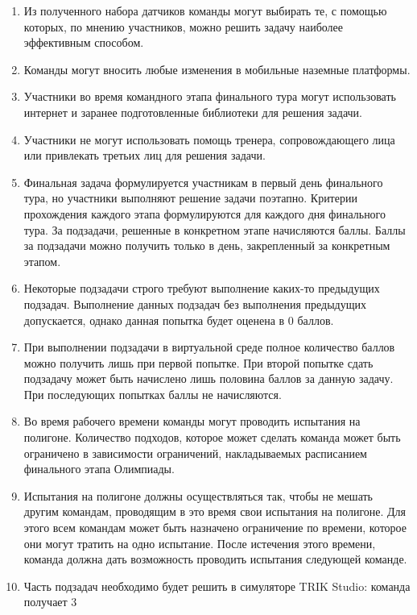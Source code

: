 \begin{enumerate}
    \item Из полученного набора датчиков команды могут выбирать те, с помощью которых,
            по мнению участников, можно решить задачу наиболее эффективным способом.
    \item Команды могут вносить любые изменения в мобильные наземные платформы.
    \item Участники во время командного этапа финального тура могут использовать интернет и заранее подготовленные библиотеки для решения задачи.
    \item Участники не могут использовать помощь тренера, сопровождающего лица или привлекать третьих лиц для решения задачи.
    \item Финальная задача формулируется участникам в первый день финального тура, но участники выполняют решение
            задачи поэтапно. Критерии прохождения каждого этапа формулируются для каждого дня финального тура.
            За подзадачи, решенные в конкретном этапе начисляются баллы. Баллы за подзадачи можно получить только в день,
            закрепленный за конкретным этапом.
    \item Некоторые подзадачи строго требуют выполнение каких-то предыдущих подзадач. Выполнение данных подзадач
            без выполнения предыдущих допускается, однако данная попытка будет оценена в 0 баллов.
    \item При выполнении подзадачи в виртуальной среде полное количество баллов можно получить лишь при первой попытке.
            При второй попытке сдать подзадачу может быть начислено лишь половина баллов за данную задачу.
            При последующих попытках баллы не начисляются.
    \item Во время рабочего времени команды могут проводить испытания на полигоне. Количество 
            подходов, которое может сделать команда может быть ограничено в зависимости ограничений,
            накладываемых расписанием финального этапа Олимпиады.
    \item Испытания на полигоне должны осуществляться так, чтобы не мешать другим командам, 
            проводящим в это время свои испытания на полигоне. Для этого всем командам может
            быть назначено ограничение по времени, которое они могут тратить на одно испытание. После
            истечения этого времени, команда должна дать возможность проводить испытания следующей команде.
    \item Часть подзадач необходимо будет решить в симуляторе TRIK Studio: команда получает 3 

\end{enumerate}
